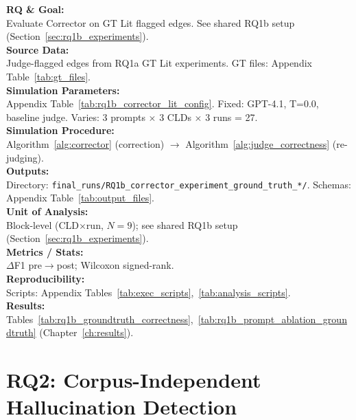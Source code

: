 \textbf{RQ \& Goal:}\\
Evaluate Corrector on GT Lit flagged edges. See shared RQ1b setup (Section~\ref{sec:rq1b_experiments}).\\
\textbf{Source Data:}\\
Judge-flagged edges from RQ1a GT Lit experiments. GT files: Appendix Table~\ref{tab:gt_files}.\\
\textbf{Simulation Parameters:}\\
Appendix Table~\ref{tab:rq1b_corrector_lit_config}. Fixed: GPT-4.1, T=0.0, baseline judge. Varies: 3 prompts $\times$ 3 CLDs $\times$ 3 runs = 27.\\
\textbf{Simulation Procedure:}\\
Algorithm~\ref{alg:corrector} (correction) $\rightarrow$ Algorithm~\ref{alg:judge_correctness} (re-judging).\\
\textbf{Outputs:}\\
Directory: \texttt{final\_runs/RQ1b\_corrector\_experiment\_ground\_truth\_*/}. Schemas: Appendix Table~\ref{tab:output_files}.\\
\textbf{Unit of Analysis:}\\
Block-level (CLD$\times$run, $N=9$); see shared RQ1b setup (Section~\ref{sec:rq1b_experiments}).\\
\textbf{Metrics / Stats:}\\
$\Delta$F1 pre$\rightarrow$post; Wilcoxon signed-rank.\\
\textbf{Reproducibility:}\\
Scripts: Appendix Tables~\ref{tab:exec_scripts},~\ref{tab:analysis_scripts}.\\
\textbf{Results:}\\
Tables~\ref{tab:rq1b_groundtruth_correctness},~\ref{tab:rq1b_prompt_ablation_groundtruth} (Chapter~\ref{ch:results}).

\section{RQ2: Corpus-Independent Hallucination Detection}
\label{sec:rq2_experiments}

